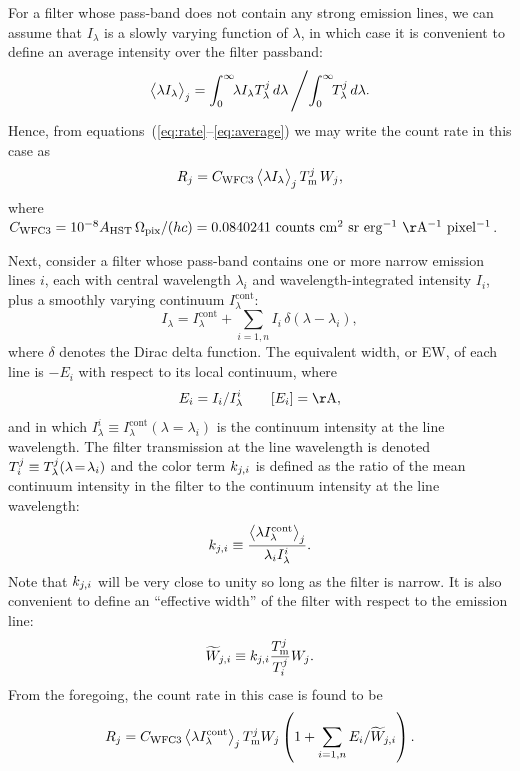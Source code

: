 \documentclass[preprint, 10pt]{aastex}
\begin{document}
For a filter whose pass-band does not contain any strong emission
lines, we can assume that \(I_\lambda\) is a slowly varying function of
\(\lambda\), in which case it is convenient to define an average
intensity over the filter passband:
\begin{equation}
  \label{eq:average}
  \bigl\langle \lambda I_\lambda \bigr\rangle_{j} = \int_0^\infty \!\!\lambda I_\lambda T_{\lambda}^{j} \, d\lambda \,
  \Bigg/\! \int_0^\infty \!\!T_{\lambda}^{j} \, d\lambda .
\end{equation}
Hence, from equations~(\ref{eq:rate}--\ref{eq:average}) we may write
the count rate in this case as
\begin{equation}
  \label{eq:continuum}
  R_j = C_{\mathrm{WFC3}}\, \bigl\langle \lambda I_\lambda \bigr\rangle_{j}\, T_{\mathrm{m}}^{j}\, W_j , 
\end{equation}
where \(\Constant = 10^{-8} \Area\, \Pixel / (h c) = 0.0840241\ \U{counts\
  cm^2\
  sr\ erg^{-1}\ \AA^{-1}\ pixel^{-1}}\). 

Next, consider a filter whose pass-band contains 
one or more narrow emission lines \(i\), 
each with central wavelength \(\lambda_i\) 
and wavelength-integrated intensity \(I_i\),
plus a smoothly varying continuum \(I_\lambda^{\mathrm{cont}}\):
\begin{equation}
  \label{eq:line-plus-cont}
  I_\lambda = I_\lambda^{\mathrm{cont}} + 
  \sum_{i=1, n} I_i\, \delta(\lambda - \lambda_i)  ,
\end{equation}
where \(\delta\) denotes the Dirac delta function.
The equivalent width, or EW, of each line is
\(-E_i\) with respect to its local continuum, where
\begin{equation}
  \label{eq:EW}
  E_i = I_i / I_\lambda^i \quad\quad [E_i] = \U{\AA}, 
\end{equation}
and in which \(I_\lambda^i \equiv I_\lambda^{\mathrm{cont}} (\lambda \!=\!
\lambda_i)\) is the continuum intensity at the line wavelength.  
The filter transmission at the line wavelength is denoted 
\(T_{i}^{j} \equiv T_{\lambda}^{j}(\lambda\!=\!\lambda_i)\)
and the color term \(k_{j, i}\) is defined as 
the ratio of the mean continuum intensity in the filter to the
continuum intensity at the line wavelength:
\begin{equation}
  \label{eq:line-color}
  k_{j, i} \equiv \frac{\bigl\langle \lambda I_\lambda^{\mathrm{cont}} \bigr\rangle_{j}}{\lambda_i I_\lambda^i} . 
\end{equation}
Note that \(k_{j, i}\) will be very close to unity so long as the
filter is narrow.  
It is also convenient to define an ``effective width'' of the filter 
with respect to the emission line: 
\begin{equation}
  \label{eq:effective}
  \widetilde{W}_{j, i} \equiv k_{j, i} \frac{T_{\mathrm{m}}^{j}}{T_{i}^{j}} W_j .
\end{equation}
From the foregoing, the count rate in this case is found to be
\begin{equation}
  \label{eq:R-line-plus-cont}
  R_j 
  = C_{\mathrm{WFC3}}\, \bigl\langle \lambda I_\lambda^{\mathrm{cont}} \bigr\rangle_{j} \, T_{\mathrm{m}}^{j} W_j 
  \left(
     1 + \sum_{i=1,n} E_i / \widetilde{W}_{j, i}
  \right) 
  .
\end{equation}
\end{document}
